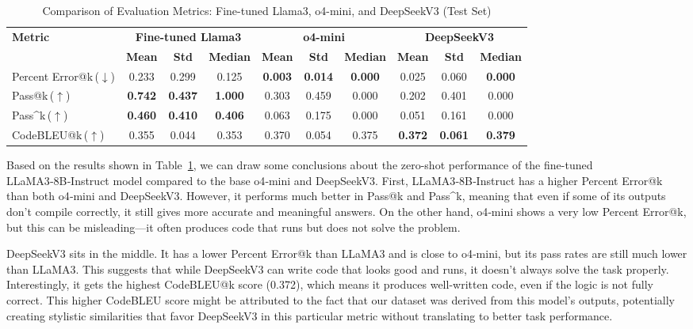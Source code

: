 \begin{table}[hbtp]
\centering
\setlength{\tabcolsep}{3.5pt}
\small
\begin{tabular}{l|ccc|ccc|ccc}
\toprule
\textbf{Metric} & \multicolumn{3}{c|}{\textbf{Fine-tuned Llama3}} & \multicolumn{3}{c|}{\textbf{o4-mini}} & \multicolumn{3}{c}{\textbf{DeepSeekV3}} \\
\cmidrule(lr){2-4} \cmidrule(lr){5-7} \cmidrule(lr){8-10}
 & \textbf{Mean} & \textbf{Std} & \textbf{Median} & \textbf{Mean} & \textbf{Std} & \textbf{Median} & \textbf{Mean} & \textbf{Std} & \textbf{Median} \\
 \midrule
Percent Error@k\,($\downarrow$)  & 0.233 & 0.299 & 0.125 & \textbf{0.003} & \textbf{0.014} & \textbf{0.000} & 0.025 & 0.060 & \textbf{0.000} \\
Pass@k\,($\uparrow$)           & \textbf{0.742} & \textbf{0.437} & \textbf{1.000} & 0.303 & 0.459 & 0.000 & 0.202 & 0.401 & 0.000 \\
Pass\textasciicircum k\,($\uparrow$)     & \textbf{0.460} & \textbf{0.410} & \textbf{0.406} & 0.063 & 0.175 & 0.000 & 0.051 & 0.161 & 0.000 \\
CodeBLEU@k\,($\uparrow$)     & 0.355 & 0.044 & 0.353 & 0.370 & 0.054 & 0.375 & \textbf{0.372} & \textbf{0.061} & \textbf{0.379} \\
\bottomrule
\end{tabular}
\caption{Comparison of Evaluation Metrics: Fine-tuned Llama3, o4-mini, and DeepSeekV3 (Test Set)}
\label{tab:combined_metrics}
\end{table}

Based on the results shown in Table~\ref{tab:combined_metrics}, we can draw some conclusions about the zero-shot performance of the fine-tuned LLaMA3‑8B‑Instruct model compared to the base o4‑mini and DeepSeekV3. First, LLaMA3‑8B‑Instruct has a higher Percent Error@k than both o4‑mini and DeepSeekV3. However, it performs much better in Pass@k and Pass\textasciicircum k, meaning that even if some of its outputs don't compile correctly, it still gives more accurate and meaningful answers. On the other hand, o4‑mini shows a very low Percent Error@k, but this can be misleading—it often produces code that runs but does not solve the problem.

DeepSeekV3 sits in the middle. It has a lower Percent Error@k than LLaMA3 and is close to o4‑mini, but its pass rates are still much lower than LLaMA3. This suggests that while DeepSeekV3 can write code that looks good and runs, it doesn't always solve the task properly. Interestingly, it gets the highest CodeBLEU@k score (0.372), which means it produces well-written code, even if the logic is not fully correct. This higher CodeBLEU score might be attributed to the fact that our dataset was derived from this model's outputs, potentially creating stylistic similarities that favor DeepSeekV3 in this particular metric without translating to better task performance.


